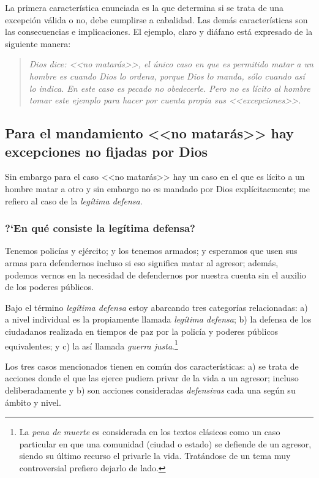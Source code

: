 \documentclass{article}
\begin{document}
\noindent
La primera caracter\'{i}stica enunciada es la que determina si se trata de una excepci\'on v\'alida o no, debe cumplirse a cabalidad. Las dem\'as caracter\'{i}sticas son las consecuencias e implicaciones. El ejemplo, claro y di\'afano est\'a expresado de la siguiente manera:

\begin{quote}
\emph{Dios dice: <<no matar\'as>>, el \'unico caso en que es permitido matar a un hombre es cuando Dios lo ordena, porque Dios lo manda, s\'olo cuando as\'{i} lo indica. En este caso es pecado no obedecerle. Pero no es l\'{i}cito al hombre tomar este ejemplo para hacer por cuenta propia sus <<excepciones>>.}
\end{quote}

\subsection{Para el mandamiento <<no matar\'as>> hay excepciones no fijadas por Dios}

Sin embargo para el caso <<no matar\'as>> hay un caso en el que es l\'{i}cito a un hombre matar a otro y sin embargo no es mandado por Dios expl\'{i}citaemente; me refiero al caso de la \emph{leg\'{i}tima defensa}.

\subsubsection{?`En qu\'e consiste la leg\'{i}tima defensa?}

Tenemos polic\'{i}as y ej\'ercito; y los tenemos armados; y esperamos que usen sus armas para defendernos incluso si eso significa matar al agresor; adem\'as, podemos vernos en la necesidad de defendernos por nuestra cuenta sin el auxilio de los poderes p\'ublicos.

Bajo el t\'ermino \emph{leg\'{i}tima defensa} estoy abarcando tres categor\'{i}as relacionadas: a) a nivel individual es la propiamente llamada \emph{leg\'{i}tima defensa}; b) la defensa de los ciudadanos realizada en tiempos de paz por la polic\'{i}a y poderes p\'ublicos equivalentes; y c) la as\'{i} llamada \emph{guerra justa}.\footnote{La \emph{pena de muerte} es considerada en los textos cl\'asicos como un caso particular en que una comunidad (ciudad o estado) se defiende de un agresor, siendo su \'ultimo recurso el privarle la vida. Trat\'andose de un tema muy controversial prefiero dejarlo de lado.}

Los tres casos mencionados tienen en com\'un dos caracter\'{i}sticas: a) se trata de acciones donde el que las ejerce pudiera privar de la vida a un agresor; incluso deliberadamente y b) son acciones consideradas \emph{defensivas} cada una seg\'un su \'ambito y nivel.
\end{document}
